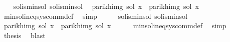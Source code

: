 \begin{isabellebody}
\ \ \isamarkupfalse%
\ sol{}{\isacharunderscore}{\kern0pt}is{\isacharunderscore}{\kern0pt}min{\isacharunderscore}{\kern0pt}sol\ sol{}{\isacharunderscore}{\kern0pt}is{\isacharunderscore}{\kern0pt}min{\isacharunderscore}{\kern0pt}sol\ \isamarkupfalse%
\ {\isachardoublequoteopen}parikh{\isacharunderscore}{\kern0pt}img\ {\isacharparenleft}{\kern0pt}sol{}\ x{\isacharparenright}{\kern0pt}\ {\isasymsubseteq}\ parikh{\isacharunderscore}{\kern0pt}img\ {\isacharparenleft}{\kern0pt}sol{}\ x{\isacharparenright}{\kern0pt}{\isachardoublequoteclose}\isanewline
\ \ \ \ \isamarkupfalse%
\ min{\isacharunderscore}{\kern0pt}sol{\isacharunderscore}{\kern0pt}ineq{\isacharunderscore}{\kern0pt}sys{\isacharunderscore}{\kern0pt}comm{\isacharunderscore}{\kern0pt}def\ \isamarkupfalse%
\ simp\isanewline
\ \ \isamarkupfalse%
\ \isamarkupfalse%
\ sol{}{\isacharunderscore}{\kern0pt}is{\isacharunderscore}{\kern0pt}min{\isacharunderscore}{\kern0pt}sol\ sol{}{\isacharunderscore}{\kern0pt}is{\isacharunderscore}{\kern0pt}min{\isacharunderscore}{\kern0pt}sol\ \isamarkupfalse%
\ {\isachardoublequoteopen}parikh{\isacharunderscore}{\kern0pt}img\ {\isacharparenleft}{\kern0pt}sol{}\ x{\isacharparenright}{\kern0pt}\ {\isasymsubseteq}\ parikh{\isacharunderscore}{\kern0pt}img\ {\isacharparenleft}{\kern0pt}sol{}\ x{\isacharparenright}{\kern0pt}{\isachardoublequoteclose}\isanewline
\ \ \ \ \isamarkupfalse%
\ min{\isacharunderscore}{\kern0pt}sol{\isacharunderscore}{\kern0pt}ineq{\isacharunderscore}{\kern0pt}sys{\isacharunderscore}{\kern0pt}comm{\isacharunderscore}{\kern0pt}def\ \isamarkupfalse%
\ simp\isanewline
\ \ \isamarkupfalse%
\ \isamarkupfalse%
\ {\isacharquery}{\kern0pt}thesis\ \isamarkupfalse%
\ blast\isanewline
{}\isamarkupfalse%
%
\endisatagproof
{\isafoldproof}%
%
\isadelimproof
\isanewline
%
\endisadelimproof
\isanewline
%
\isadelimtheory
\isanewline
%
\endisadelimtheory
%
\isatagtheory
{}\isamarkupfalse%
%
\endisatagtheory
{\isafoldtheory}%
%
\isadelimtheory
%
\endisadelimtheory
%
\end{isabellebody}%
\endinput
